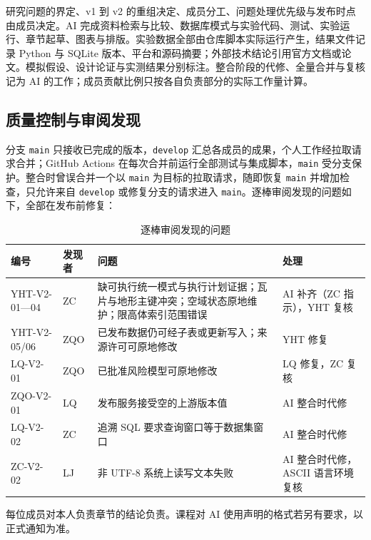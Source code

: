 \documentclass[a4paper,11pt,UTF8]{ctexart}
\begin{document}
研究问题的界定、v1 到 v2 的重组决定、成员分工、问题处理优先级与发布时点由成员决定。AI 完成资料检索与比较、数据库模式与实验代码、测试、实验运行、章节起草、图表与排版。实验数据全部由仓库脚本实际运行产生，结果文件记录 Python 与 SQLite 版本、平台和源码摘要；外部技术结论引用官方文档或论文。模拟假设、设计论证与实测结果分别标注。整合阶段的代修、全量合并与复核记为 AI 的工作；成员贡献比例只按各自负责部分的实际工作量计算。

\subsection{质量控制与审阅发现}

分支 \texttt{main} 只接收已完成的版本，\texttt{develop} 汇总各成员的成果，个人工作经拉取请求合并；GitHub Actions 在每次合并前运行全部测试与集成脚本，\texttt{main} 受分支保护。整合时曾误合并一个以 \texttt{main} 为目标的拉取请求，随即恢复 \texttt{main} 并增加检查，只允许来自 \texttt{develop} 或修复分支的请求进入 \texttt{main}。逐棒审阅发现的问题如下，全部在发布前修复：

\begin{table}[H]\centering\small
\caption{逐棒审阅发现的问题}
\begin{tabularx}{\textwidth}{L{2.3cm}L{1.6cm}YL{2.6cm}}
\toprule
编号 & 发现者 & 问题 & 处理 \\
\midrule
YHT-V2-01—04 & ZC & 缺可执行统一模式与执行计划证据；瓦片与地形主键冲突；空域状态原地维护；限高体索引范围错误 & AI 补齐（ZC 指示），YHT 复核 \\
YHT-V2-05/06 & ZQO & 已发布数据仍可经子表或更新写入；来源许可可原地修改 & YHT 修复 \\
LQ-V2-01 & ZQO & 已批准风险模型可原地修改 & LQ 修复，ZC 复核 \\
ZQO-V2-01 & LQ & 发布服务接受空的上游版本值 & AI 整合时代修 \\
LQ-V2-02 & ZC & 追溯 SQL 要求查询窗口等于数据集窗口 & AI 整合时代修 \\
ZC-V2-02 & LJ & 非 UTF-8 系统上读写文本失败 & AI 整合时代修，ASCII 语言环境复核 \\
\bottomrule
\end{tabularx}
\end{table}

每位成员对本人负责章节的结论负责。课程对 AI 使用声明的格式若另有要求，以正式通知为准。
\end{document}
